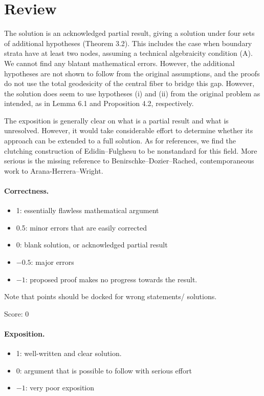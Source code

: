 \documentclass[11pt]{article}
\theoremstyle{definition}
\theoremstyle{remark}
\begin{document}
\maketitle

\section{Review}
The solution is an acknowledged partial result, giving a solution under four sets of additional hypotheses (Theorem 3.2). This includes the case when boundary strata have at least two nodes, assuming a technical algebraicity condition (A).
We cannot find any blatant mathematical errors.
However, the additional hypotheses are not shown to follow from the original assumptions, and the proofs do not use the total geodesicity of the central fiber to bridge this gap.
However, the solution does seem to use hypotheses (i) and (ii) from the original problem as intended, as in Lemma 6.1 and Proposition 4.2, respectively.

The exposition is generally clear on what is a partial result and what is unresolved.
However, it would take considerable effort to determine whether its approach can be extended to a full solution.
As for references, we find the clutching construction of Edidin–Fulghesu to be nonstandard for this field.
More serious is the missing reference to Benirschke–Dozier–Rached, contemporaneous work to Arana-Herrera–Wright.

\paragraph{Correctness.}
\begin{itemize}
	\item  1: essentially flawless mathematical argument
	\item  0.5: minor errors that are easily corrected
	\item  0: blank solution, or acknowledged partial result
	\item  $-0.5$: major errors
	\item  $-1$: proposed proof makes no progress towards the result.
\end{itemize}
Note that points should be docked for wrong statements/ solutions.

\noindent Score: 0

\paragraph{Exposition.}
\begin{itemize}
	\item  1: well-written and clear solution.
	\item  0: argument that is possible to follow with serious effort
	\item  $-1$: very poor exposition
\end{itemize}
\end{document}
